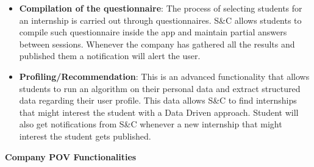 \begin{itemize}
      \item \textbf{Compilation of the questionnaire}: The process of selecting students for an internship is carried
            out through questionnaires. S\&C allows students to compile such questionnaire inside the app and maintain
            partial answers between sessions. Whenever the company has gathered all the results and published them a
            notification will alert the user.
      \item \textbf{Profiling/Recommendation}: This is an advanced functionality that allows students to run an
            algorithm on their personal data and extract structured data regarding their user profile. This data allows
            S\&C to find internships that might interest the student with a Data Driven approach. Student will also get
            notifications from S\&C whenever a new internship that might interest the student gets published.
\end{itemize}

\par\textbf{Company POV Functionalities}

